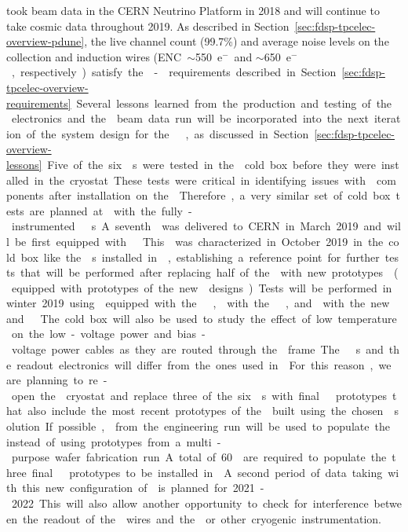  took beam data in the CERN Neutrino Platform in 2018 and will continue
to take cosmic data throughout 2019. As described in Section~\ref{sec:fdsp-tpcelec-overview-pdune},
the live channel count (99.7\%) and average noise levels on the collection and induction wires 
(ENC~$\sim$\SI{550}{e$^-$} and $\sim$\SI{650}{e$^-$}, respectively) satisfy the - requirements described 
in Section~\ref{sec:fdsp-tpcelec-overview-requirements}. Several lessons learned from the production 
and testing of the  electronics and the  beam data run will be incorporated into the 
next iteration of the system design for the  , as discussed in 
Section~\ref{sec:fdsp-tpcelec-overview-lessons}.

Five of the six s were tested in the  cold box
before they were installed in the cryostat. These tests were critical
in identifying issues with  components after installation
on the . Therefore, a very similar set of cold box tests are planned at  
with the fully-instrumented  s. A seventh  was delivered
to CERN in March 2019 and will be first equipped with  . This
 was characterized in October 2019 in the cold box like the s installed
in , establishing a reference point for further tests that will be
performed after replacing half of the  with new prototypes  (equipped with prototypes of the
new  designs). Tests will be performed in 
winter 2019 using  equipped with the  , 
with the  , and  with the new  and
 . The cold box will also be used to study the effect of
low temperature on the low-voltage power and bias-voltage power cables as they are 
routed through the  frame.

The  s and the readout electronics will differ from the ones used 
in . For this reason, we are planning to re-open the  cryostat 
and replace three of the six s with final   prototypes that also include 
the most recent prototypes of the  built using the chosen  solution.
If possible,  from the engineering 
run will be used to populate the  instead of using prototypes from a multi-purpose
wafer fabrication run. A total of \num{60}  are required to populate the three 
final   prototypes to be installed in . A second period of data taking 
with this new configuration of  is planned for 2021-2022. This will also 
allow another opportunity to check for interference between the readout of the  
wires and the  or other cryogenic instrumentation. 

